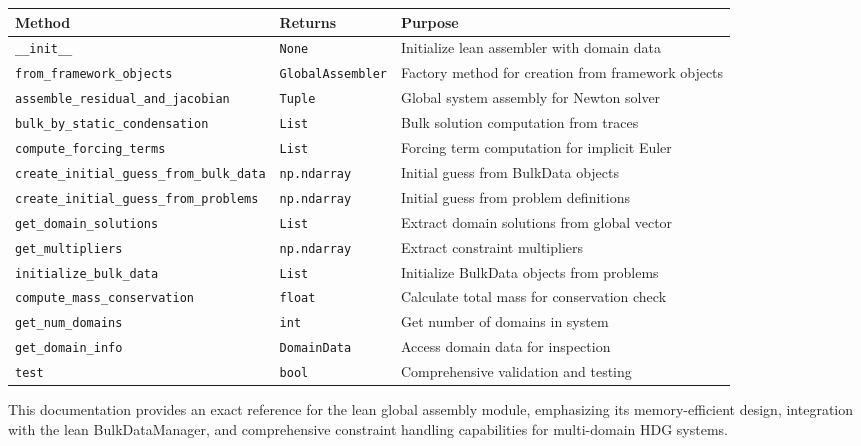 \begin{longtable}{|p{7cm}|p{3cm}|p{4.8cm}|}
\hline
\textbf{Method} & \textbf{Returns} & \textbf{Purpose} \\
\hline
\endhead

\texttt{\_\_init\_\_} & \texttt{None} & Initialize lean assembler with domain data \\
\hline

\texttt{from\_framework\_objects} & \texttt{GlobalAssembler} & Factory method for creation from framework objects \\
\hline

\texttt{assemble\_residual\_and\_jacobian} & \texttt{Tuple} & Global system assembly for Newton solver \\
\hline

\texttt{bulk\_by\_static\_condensation} & \texttt{List} & Bulk solution computation from traces \\
\hline

\texttt{compute\_forcing\_terms} & \texttt{List} & Forcing term computation for implicit Euler \\
\hline

\texttt{create\_initial\_guess\_from\_bulk\_data} & \texttt{np.ndarray} & Initial guess from BulkData objects \\
\hline

\texttt{create\_initial\_guess\_from\_problems} & \texttt{np.ndarray} & Initial guess from problem definitions \\
\hline

\texttt{get\_domain\_solutions} & \texttt{List} & Extract domain solutions from global vector \\
\hline

\texttt{get\_multipliers} & \texttt{np.ndarray} & Extract constraint multipliers \\
\hline

\texttt{initialize\_bulk\_data} & \texttt{List} & Initialize BulkData objects from problems \\
\hline

\texttt{compute\_mass\_conservation} & \texttt{float} & Calculate total mass for conservation check \\
\hline

\texttt{get\_num\_domains} & \texttt{int} & Get number of domains in system \\
\hline

\texttt{get\_domain\_info} & \texttt{DomainData} & Access domain data for inspection \\
\hline

\texttt{test} & \texttt{bool} & Comprehensive validation and testing \\
\hline

\end{longtable}

This documentation provides an exact reference for the lean global assembly module, emphasizing its memory-efficient design, integration with the lean BulkDataManager, and comprehensive constraint handling capabilities for multi-domain HDG systems.

